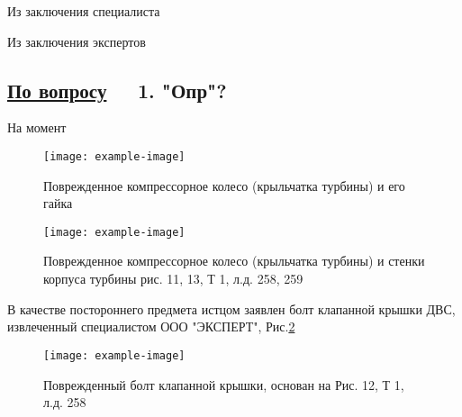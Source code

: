 Из заключения специалиста  

\vspace{\baselineskip}
%
%
Из заключения экспертов  

\vspace{\baselineskip}
\renewcommand\baselinestretch{0.86}\small\normalsize 
\subsection{\underline{По  вопросу}\, \, \,	\textbf{\small{1. "Опр"?}}}
\renewcommand\baselinestretch{1.2}\small\normalsize
На момент 

 \begin{figure}[H]\centering
	\parbox[t]{0.49\textwidth}
	{\centering
		\texttt{[image: example-image]}
		\caption{\footnotesize {Поврежденное компрессорное колесо (крыльчатка турбины) и его  гайка  }}
		\label{ris:images/k1}}
	\hfil \hfil
	\parbox[t]{0.49\textwidth}
	{\centering
		\texttt{[image: example-image]}
				\caption{\footnotesize {Поврежденное компрессорное колесо (крыльчатка турбины) и стенки корпуса турбины
				рис. 11, 13, Т 1, л.д. 258, 259}}
		\label{ris:images/k2}}
	
\end{figure}

В качестве постороннего предмета истцом заявлен болт клапанной крышки ДВС, извлеченный специалистом ООО "ЭКСПЕРТ",  Рис.\ref{ris:images/b1}
\vspace{\baselineskip}  %

  \begin{figure}[!h]
	\centering
	\texttt{[image: example-image]}
	\caption{{\footnotesize {Поврежденный болт клапанной крышки, основан на Рис. 12, Т 1, л.д. 258}}}
	\label{ris:images/b1}
\end{figure}



